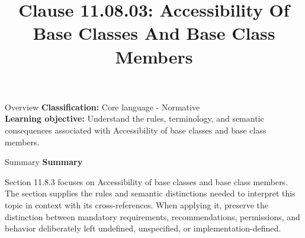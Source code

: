 \documentclass[10pt,letterpaper]{article}
\title{Clause 11.08.03: Accessibility Of Base Classes And Base Class Members}
\author{}
\date{}
\begin{document}
\maketitle
\begin{CornellOverviewBox}{Overview}
\textbf{Classification:} Core language - Normative\\[2pt]
\textbf{Learning objective:} Understand the rules, terminology, and semantic consequences associated with Accessibility of base classes and base class members.
\end{CornellOverviewBox}\begin{CornellSummaryBox}{Summary}
{\sffamily\bfseries\color{Accent} Summary}\par\vspace{3pt}Section 11.8.3 focuses on Accessibility of base classes and base class members. The section supplies the rules and semantic distinctions needed to interpret this topic in context with its cross-references. When applying it, preserve the distinction between mandatory requirements, recommendations, permissions, and behavior deliberately left undefined, unspecified, or implementation-defined.
\end{CornellSummaryBox}
\end{document}
